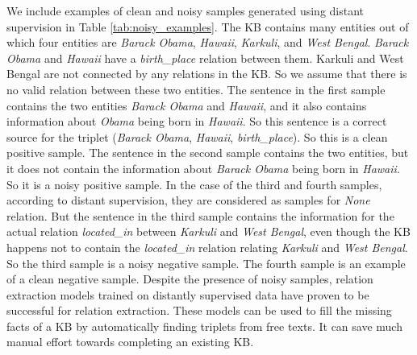 We include examples of clean and noisy samples generated using distant supervision in Table \ref{tab:noisy_examples}. The KB contains many entities out of which four entities are {\em Barack Obama}, {\em Hawaii}, {\em Karkuli}, and {\em West Bengal}. {\em Barack Obama} and {\em Hawaii} have a {\em birth\_place} relation between them. Karkuli and West Bengal are not connected by any relations in the KB. So we assume that there is no valid relation between these two entities. The sentence in the first sample contains the two entities {\em Barack Obama} and {\em Hawaii}, and it also contains information about {\em Obama} being born in {\em Hawaii}. So this sentence is a correct source for the triplet ({\em Barack Obama}, {\em Hawaii}, {\em birth\_place}). So this is a clean positive sample. The sentence in the second sample contains the two entities, but it does not contain the information about {\em Barack Obama} being born in {\em Hawaii}. So it is a noisy positive sample. In the case of the third and fourth samples, according to distant supervision, they are considered as samples for {\em None} relation. But the sentence in the third sample contains the information for the actual relation {\em located\_in} between {\em Karkuli} and {\em West Bengal}, even though the KB happens not to contain the {\em located\_in} relation relating {\em Karkuli} and {\em West Bengal}. So the third sample is a noisy negative sample. The fourth sample is an example of a clean negative sample.
Despite the presence of noisy samples, relation extraction models trained on distantly supervised data have proven to be successful for relation extraction. These models can be used to fill the missing facts of a KB by automatically finding triplets from free texts. It can save much manual effort towards completing an existing KB.


